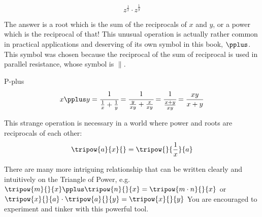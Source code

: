 {\Large
$$z^{\frac{1}{x}} \cdot z^{\frac{1}{y}}$$
}

The answer is a root which is the sum of the reciprocals of $x$ and $y$, or a power which is the
reciprocal of that!  This unusual operation is actually rather common in practical applications and
deserving of its own symbol in this book, $\pplus$.  This symbol was chosen because
the reciprocal of the sum of reciprocal is used in parallel resistance, whose symbol is $\parallel$.


\begin{derivation}{P-plus}
$$x\pplus y = \cfrac{1}{\frac{1}{x}+\frac{1}{y}} = \cfrac{1}{\frac{y}{xy}+\frac{x}{xy}} = 
\cfrac{1}{\frac{x+y}{xy}} = \frac{xy}{x+y}$$
\end{derivation}


This strange operation is necessary in a world where power and roots are reciprocals of
each other:
$$
\tripow{a}{x}{} = \tripow{}{\frac{1}{x}}{a}
$$

There are many more intriguing relationship that can be written clearly and intuitively
on the Triangle of Power, e.g. $\tripow{m}{}{x}\pplus\tripow{n}{}{x} = \tripow{m\cdot{}n}{}{x}$
or $\tripow{x}{}{a}\cdot{}\tripow{a}{}{y} = \tripow{x}{}{y}$  You are encouraged to experiment
and tinker with this powerful tool.
